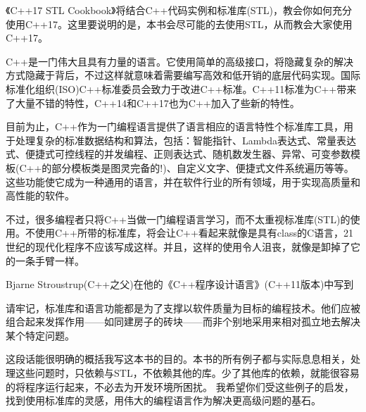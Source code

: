 《C++17 STL Cookbook》将结合C++代码实例和标准库(STL)，教会你如何充分使用C++17。这里要说明的是，本书会尽可能的去使用STL，从而教会大家使用C++17。

C++是一门伟大且具有力量的语言。它使用简单的高级接口，将隐藏复杂的解决方式隐藏于背后，不过这样就意味着需要编写高效和低开销的底层代码实现。国际标准化组织(ISO)C++标准委员会致力于改进C++标准。C++11标准为C++带来了大量不错的特性，C++14和C++17也为C++加入了些新的特性。

目前为止，C++作为一门编程语言提供了语言相应的语言特性个标准库工具，用于处理复杂的标准数据结构和算法，包括：智能指针、Lambda表达式、常量表达式、便捷式可控线程的并发编程、正则表达式、随机数发生器、异常、可变参数模板(C++的部分模板类是图灵完备的!)、自定义文字、便捷式文件系统遍历等等。这些功能使它成为一种通用的语言，并在软件行业的所有领域，用于实现高质量和高性能的软件。

不过，很多编程者只将C++当做一门编程语言学习，而不太重视标准库(STL)的使用。不使用C++所带的标准库，将会让C++看起来就像是具有class的C语言，21世纪的现代化程序不应该写成这样。并且，这样的使用令人沮丧，就像是卸掉了它的一条手臂一样。

Bjarne Stroustrup(C++之父)在他的《C++程序设计语言》(C++11版本)中写到

\begin{myQuote}
请牢记，标准库和语言功能都是为了支撑以软件质量为目标的编程技术。他们应被组合起来发挥作用——如同建房子的砖块——而非个别地采用来相对孤立地去解决某个特定问题。
\end{myQuote}

这段话能很明确的概括我写这本书的目的。本书的所有例子都与实际息息相关，处理这些问题时，只依赖与STL，不依赖其他的库。少了其他库的依赖，就能很容易的将程序运行起来，不必去为开发环境所困扰。 我希望你们受这些例子的启发，找到使用标准库的灵感，用伟大的编程语言作为解决更高级问题的基石。

